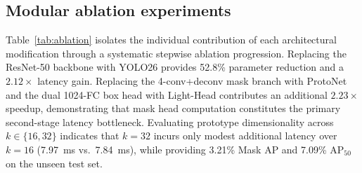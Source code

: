 \documentclass[5p,times]{elsarticle}
\begin{document}
\subsection{Modular ablation experiments}
Table~\ref{tab:ablation} isolates the individual contribution of each architectural modification through a systematic stepwise ablation progression. Replacing the ResNet-50 backbone with YOLO26 provides 52.8\% parameter reduction and a $2.12\times$ latency gain. Replacing the 4-conv+deconv mask branch with ProtoNet and the dual 1024-FC box head with Light-Head contributes an additional $2.23\times$ speedup, demonstrating that mask head computation constitutes the primary second-stage latency bottleneck. Evaluating prototype dimensionality across $k \in \{16, 32\}$ indicates that $k=32$ incurs only modest additional latency over $k=16$ (7.97~ms vs.\ 7.84~ms), while providing 3.21\% Mask AP and 7.09\% $\mathrm{AP}_{50}$ on the unseen test set.

\begin{table}[t]
\centering
\caption{Modular ablation study isolating the stepwise contributions of backbone substitution, head simplification, and prototype basis dimensionality ($k$). Evaluated at $640 \times 640$ on RTX 3070 Ti GPU and tested on the PlantSeg test partition.}
\label{tab:ablation}
\end{table}
\end{document}
